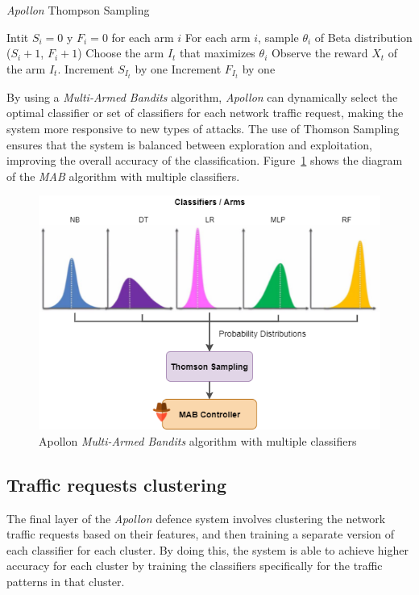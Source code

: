 \begin{algorithm} 
    \caption{\textit{Apollon} Thompson Sampling}
    \label{alg:thompson-sampling}
    \begin{algorithmic}
        \State Intit $S_i = 0$ y $F_i = 0$ for each arm $i$
            \State For each arm $i$, sample $\theta_i$ of Beta distribution ($S_i + 1$, $F_i + 1$)
            \State Choose the arm $I_t$ that maximizes $\theta_i$
            \State Observe the reward $X_t$ of the arm $I_t$.
                \State Increment $S_{I_t}$ by one
            \Else
                \State Increment $F_{I_t}$ by one
            \EndIf
        \EndFor 
    \end{algorithmic} 
\end{algorithm}

By using a \textit{Multi-Armed Bandits} algorithm, \textit{Apollon} can dynamically select the optimal classifier or set of classifiers
for each network traffic request, making the system more responsive to new types of attacks.
The use of Thomson Sampling ensures that the system is balanced between exploration and exploitation, improving the
overall accuracy of the classification.
Figure~\ref{fig:mab-algorithm} shows the diagram of the \textit{MAB} algorithm with multiple classifiers.

\begin{figure}
    \centering
    \includegraphics[width=0.9\columnwidth]{ApollonMAB.png}
    \caption{Apollon \textit{Multi-Armed Bandits} algorithm with multiple classifiers}
    \label{fig:mab-algorithm}
\end{figure}


\subsection{Traffic requests clustering}\label{subsec:traffic-requests-clustering}
The final layer of the \textit{Apollon} defence system involves clustering the network traffic requests based on their features,
and then training a separate version of each classifier for each cluster.
By doing this, the system is able to achieve higher accuracy for each cluster by training the classifiers specifically
for the traffic patterns in that cluster.

